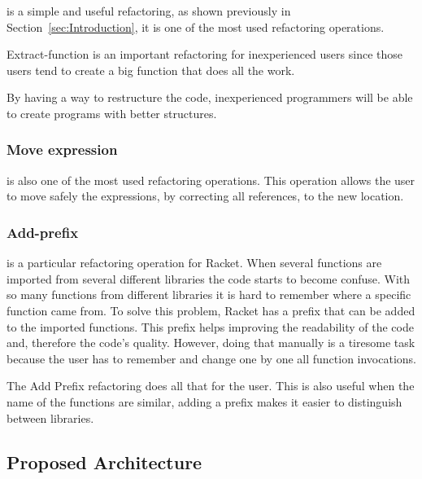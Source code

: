 is a simple and useful refactoring, as shown previously in Section~\ref{sec:Introduction}, it is one of the most used refactoring operations.

Extract-function is an important refactoring for inexperienced users since those users tend to create a big function that does all the work.

By having a way to restructure the code, inexperienced programmers will be able to create programs with better structures.




\subsubsection{Move expression}

is also one of the most used refactoring operations.
This operation allows the user to move safely the expressions, by correcting all references, to the new location. 



\subsubsection{Add-prefix}
is a particular refactoring operation for Racket.
When several functions are imported from several different libraries the code starts to become confuse.
With so many functions from different libraries it is hard to remember where a specific function came from.
To solve this problem, Racket has a prefix that can be added to the imported functions.
This prefix helps improving the readability of the code and, therefore the code's quality.
However, doing that manually is a tiresome task because the user has to remember and change one by one all function invocations.

The Add Prefix refactoring does all that for the user.
This is also useful when the name of the functions are similar, adding a prefix makes it easier to distinguish between libraries.





\subsection{Proposed Architecture}

